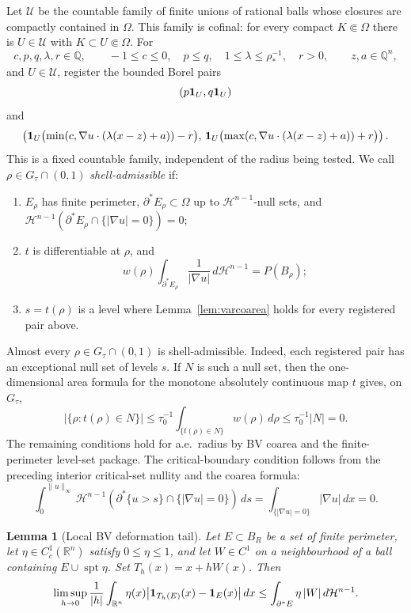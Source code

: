 \documentclass[11pt]{amsart}
\newtheorem{lemma}[theorem]{Lemma}
\theoremstyle{definition}
\newcommand{\R}{\mathbb R}
\newcommand{\Om}{\Omega}
\newcommand{\rstar}{\rho_*}
\newcommand{\wt}{w}
\newcommand{\Hn}{\mathcal H^{n-1}}
\newcommand{\Per}{P}
\begin{document}
Let \(\mathcal U\) be the countable family of finite unions of rational balls
whose closures are compactly contained in \(\Om\).  This family is cofinal:
for every compact \(K\Subset\Om\) there is \(U\in\mathcal U\) with
\(K\subset U\Subset\Om\).  For
\[
   c,p,q,\lambda,r\in\mathbb Q,\qquad
   -1\le c\le0,\quad p\le q,\quad
   1\le\lambda\le\rstar^{-1},\quad r>0,\qquad z,a\in\mathbb Q^n,
\]
and \(U\in\mathcal U\), register the bounded Borel pairs
\[
   (p{\bf1}_U,q{\bf1}_U)
\]
and
\[
   \left(
      {\bf1}_U\bigl(\min(c,\nabla u\cdot(\lambda(x-z)+a))-r\bigr),\,
      {\bf1}_U\bigl(\max(c,\nabla u\cdot(\lambda(x-z)+a))+r\bigr)
   \right).
\]
This is a fixed countable family, independent of the radius being tested.
We call \(\rho\in G_\tau\cap(0,1)\) \emph{shell-admissible} if:
\begin{enumerate}[label=(\roman*),leftmargin=2em]
\item \(E_\rho\) has finite perimeter,
\(\partial^*E_\rho\subset\Om\) up to \(\Hn\)-null sets, and
\(\Hn(\partial^*E_\rho\cap\{|\nabla u|=0\})=0\);
\item \(t\) is differentiable at \(\rho\), and
\[
   \wt(\rho)\int_{\partial^*E_\rho}\frac1{|\nabla u|}\,d\Hn
   =\Per(B_\rho);
\]
\item \(s=t(\rho)\) is a level where Lemma~\ref{lem:varcoarea} holds for
every registered pair above.
\end{enumerate}
Almost every \(\rho\in G_\tau\cap(0,1)\) is shell-admissible.  Indeed, each
registered pair has an exceptional null set of levels \(s\).  If \(N\) is
such a null set, then the one-dimensional area formula for the monotone
absolutely continuous map \(t\) gives, on \(G_\tau\),
\[
   |\{\rho:t(\rho)\in N\}|
   \le \tau_0^{-1}\int_{\{t(\rho)\in N\}} \wt(\rho)\,d\rho
   \le \tau_0^{-1}|N|=0.
\]
The remaining conditions hold for a.e.\ radius by BV coarea and the
finite-perimeter level-set package.  The critical-boundary condition follows
from the preceding interior critical-set nullity and the coarea formula:
\[
   \int_0^{\|u\|_\infty}
      \Hn(\partial^*\{u>s\}\cap\{|\nabla u|=0\})\,ds
   =
   \int_{\{|\nabla u|=0\}}|\nabla u|\,dx=0 .
\]

\begin{lemma}[Local BV deformation tail]\label{lem:BV-tail}
Let \(E\subset B_R\) be a set of finite perimeter, let
\(\eta\in C_c^1(\R^n)\) satisfy \(0\le\eta\le1\), and let \(W\in C^1\) on a
neighbourhood of a ball containing \(E\cup\operatorname{spt}\eta\).  Set
\(T_h(x)=x+hW(x)\).  Then
\[
   \limsup_{h\to0}\frac1{|h|}
   \int_{\R^n}\eta(x)
      \bigl|{\bf1}_{T_h(E)}(x)-{\bf1}_E(x)\bigr|\,dx
   \le
   \int_{\partial^*E}\eta\,|W|\,d\Hn .
\]
\end{lemma}
\end{document}
